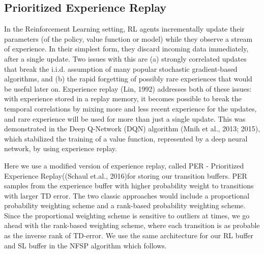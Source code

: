 \documentclass{article}
\begin{document}
\subsection{Prioritized Experience Replay}
In the Reinforcement Learning setting, RL agents incrementally update their parameters (of the policy,
value function or model) while they observe a stream of experience. In their simplest form, they
discard incoming data immediately, after a single update. Two issues with this are (a) strongly
correlated updates that break the i.i.d. assumption of many popular stochastic gradient-based algorithms,
and (b) the rapid forgetting of possibly rare experiences that would be useful later on. Experience replay (Lin, 1992) addresses both of these issues: with experience stored in a replay memory, it becomes possible to break the temporal correlations by mixing more and less recent experience for the updates, and rare experience will be used for more than just a single update. This was demonstrated in the Deep Q-Network (DQN) algorithm (Mnih et al., 2013; 2015), which stabilized the training of a value function, represented by a deep neural network, by using experience replay.

Here we use a modified version of experience replay, called PER - Prioritized Experience Replay((Schaul et.al., 2016)for storing our transition buffers. PER samples from the experience buffer with higher probability weight to transitions with larger TD error. The two classic approaches would include a proportional probability weighting scheme and a rank-based probability weighting scheme. Since the proportional weighting scheme is sensitive to outliers at times, we go ahead with the rank-based weighting scheme, where each transition is as probable as the inverse rank of TD-error. We use the same architecture for our RL buffer and SL buffer in the NFSP algorithm which follows.
\end{document}
